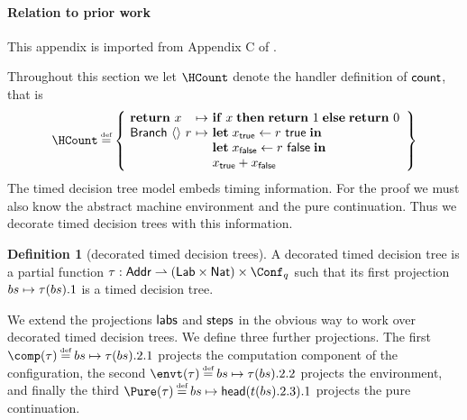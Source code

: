\documentclass[12pt,phd,lfcs,twoside,openright,logo,leftchapter,normalheadings]{infthesis}
\theoremstyle{plain}
\theoremstyle{definition}
\newtheorem{definition}[theorem]{Definition}
\begin{document}
\paragraph{Relation to prior work} This appendix is imported from
Appendix C of \citet{HillerstromLL20a}.\medskip

Throughout this section we let $\HCount$ denote the handler definition
of $\mathsf{count}$, that is
%
\[
  \HCount \defas
  \left\{
    \ba[m]{@{~}l@{~}c@{~}l}
      \Return~x           &\mapsto& \If\;x\;\Then\; \Return~1 \;\Else\; \Return~0\\
      \Branch~\Unit~r  &\mapsto&
      \ba[t]{@{}l}
        \Let\; x_\True \revto r~\True \; \In\\
        \Let\; x_\False \revto r~\False \; \In\\
        x_\True + x_\False
      \ea
    \ea
  \right\}
\]
%
The timed decision tree model embeds timing information. For the proof
we must also know the abstract machine environment and the pure
continuation. Thus we decorate timed decision trees with this
information.
%
\begin{definition}[decorated timed decision trees]
  A decorated timed decision tree is a partial function $\tree :
  \Addr \pto (\Lab \times \Nat) \times \Conf_q$ such
  that its first projection $bs \mapsto \tau(bs).1$ is a timed
  decision tree.
\end{definition}
%
We extend the projections $\mathsf{labs}$ and $\mathsf{steps}$ in the obvious way to
work over decorated timed decision trees.  We define three further
projections. The first $\comp(\tree) \defas bs \mapsto \tree(bs).2.1$
projects the computation component of the configuration, the second
$\envt(\tree) \defas bs \mapsto \tree(bs).2.2$ projects the
environment, and finally the third
$\Pure(\tree) \defas bs \mapsto \mathsf{head}(t(bs).2.3).1$ projects
the pure continuation.
\end{document}
